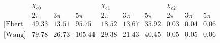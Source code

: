 $$
\begin{array}{c|ccc|ccc|ccc}
 \text{} & \chi _{\text{c0}} &  &  & \chi _{\text{c1}} &  &  & \chi _{\text{c2}} &  &  \\
 \text{} & \text{2$\pi $} & \text{3$\pi $} & \text{5$\pi $} & \text{2$\pi $} & \text{3$\pi $} & \text{5$\pi $} & \text{2$\pi $} & \text{3$\pi $} & \text{5$\pi $} \\
\hline
 \text{[Ebert]} & 49.33 & 13.51 & 95.75 & 18.52 & 13.67 & 35.92 & 0.03 & 0.04 & 0.06 \\
 \text{[Wang]} & 79.78 & 26.73 & 105.44 & 29.38 & 21.43 & 40.45 & 0.05 & 0.05 & 0.06 \\
\end{array}$$
